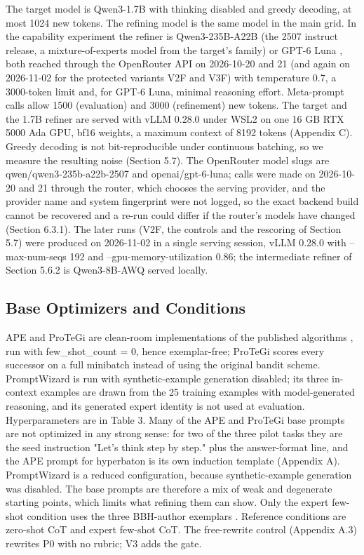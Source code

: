 \documentclass{ieeeaccess}
\begin{document}
The target model is Qwen3-1.7B \cite{qwenteam2025} with thinking disabled and greedy decoding, at most 1024 new tokens. The refining model is the same model in the main grid. In the capability experiment the refiner is Qwen3-235B-A22B (the 2507 instruct release, a mixture-of-experts model from the target's family) or GPT-6 Luna \cite{luna2026}, both reached through the OpenRouter API on 2026-10-20 and 21 (and again on 2026-11-02 for the protected variants V2F and V3F) with temperature 0.7, a 3000-token limit and, for GPT-6 Luna, minimal reasoning effort. Meta-prompt calls allow 1500 (evaluation) and 3000 (refinement) new tokens. The target and the 1.7B refiner are served with vLLM \cite{kwon2023} 0.28.0 under WSL2 on one 16 GB RTX 5000 Ada GPU, bf16 weights, a maximum context of 8192 tokens (Appendix C). Greedy decoding is not bit-reproducible under continuous batching, so we measure the resulting noise (Section 5.7). The OpenRouter model slugs are qwen/qwen3-235b-a22b-2507 and openai/gpt-6-luna; calls were made on 2026-10-20 and 21 through the router, which chooses the serving provider, and the provider name and system fingerprint were not logged, so the exact backend build cannot be recovered and a re-run could differ if the router's models have changed (Section 6.3.1). The later runs (V2F, the controls and the rescoring of Section 5.7) were produced on 2026-11-02 in a single serving session, vLLM 0.28.0 with --max-num-seqs 192 and --gpu-memory-utilization 0.86; the intermediate refiner of Section 5.6.2 is Qwen3-8B-AWQ served locally.

\subsection{Base Optimizers and Conditions}

APE and ProTeGi are clean-room implementations of the published algorithms \cite{zhou2023,pryzant2023}, run with few\_\allowbreak{}shot\_\allowbreak{}count = 0, hence exemplar-free; ProTeGi scores every successor on a full minibatch instead of using the original bandit scheme. PromptWizard \cite{agarwal2025} is run with synthetic-example generation disabled; its three in-context examples are drawn from the 25 training examples with model-generated reasoning, and its generated expert identity is not used at evaluation. Hyperparameters are in Table 3. Many of the APE and ProTeGi base prompts are not optimized in any strong sense: for two of the three pilot tasks they are the seed instruction "Let's think step by step." plus the answer-format line, and the APE prompt for hyperbaton is its own induction template (Appendix A). PromptWizard is a reduced configuration, because synthetic-example generation was disabled. The base prompts are therefore a mix of weak and degenerate starting points, which limits what refining them can show. Only the expert few-shot condition uses the three BBH-author exemplars \cite{suzgun2023}. Reference conditions are zero-shot CoT \cite{kojima2022} and expert few-shot CoT. The free-rewrite control (Appendix A.3) rewrites P0 with no rubric; V3 adds the gate.
\end{document}
